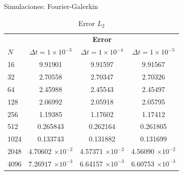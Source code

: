\begin{frame}{Simulaciones: Fourier-Galerkin \hspace{2cm} \hyperlink{Navegador}{}}
    \begin{table}
	\centering
	\begin{tabular}{lccc}
		\toprule
		\multicolumn{1}{c}{}& \multicolumn{3}{c}{\textbf{Error}} \\
		$N$& $\Delta t=1\times 10^{-3}$& $\Delta t=1\times 10^{-4}$& $\Delta t=1\times 10^{-5}$ \\
		\midrule
		16& 9.91901& 9.91597& 9.91567 \\
		\midrule
		32& 2.70558& 2.70347& 2.70326 \\
		\midrule
		64& 2.45988& 2.45543& 2.45497 \\
		\midrule
		128& 2.06992& 2.05918& 2.05795 \\
		\midrule
		256& 1.19385& 1.17602& 1.17412 \\
		\midrule
		512& 0.265843& 0.262164& 0.261805 \\
		\midrule
		1024& 0.133743& 0.131882& 0.131699 \\
		\midrule
		2048& 4.70602 $\times 10^{-2}$& 4.57371 $\times 10^{-2}$& 4.56090 $\times 10^{-2}$ \\
		\midrule
		4096& 7.26917 $\times 10^{-3}$& 6.64157 $\times 10^{-3}$& 6.60753 $\times 10^{-3}$ \\
		\bottomrule
	\end{tabular}
	\caption{Error $L_2$}
\end{table}
\end{frame}
\label{Figuras-Cero-Viscosidad}
